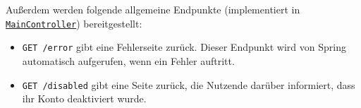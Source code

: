 Außerdem werden folgende allgemeine Endpunkte (implementiert in \hyperref[edu.kit.hci.soli.controller.MainController]{\texttt{MainController}}) bereitgestellt:
\begin{itemize}
    \item \texttt{GET /error} gibt eine Fehlerseite zurück. Dieser Endpunkt wird von Spring automatisch aufgerufen, wenn ein Fehler auftritt.
    \item \texttt{GET /disabled} gibt eine Seite zurück, die Nutzende darüber informiert, dass ihr Konto deaktiviert wurde.
\end{itemize}

